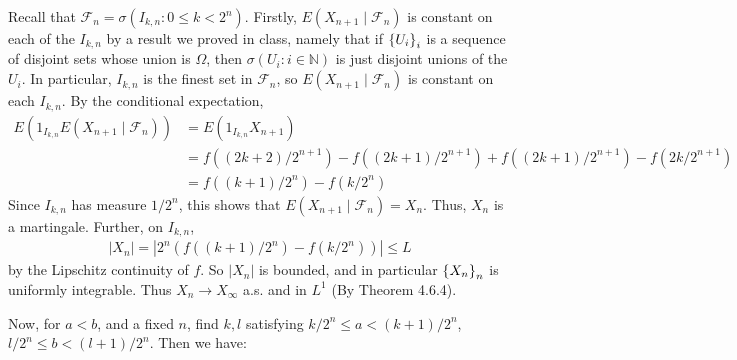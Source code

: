 \documentclass[12pt]{article}
\theoremstyle{definitionstyle}
\newcommand{\SET}[1]{\Set{\mskip-\medmuskip #1 \mskip-\medmuskip}}
\newcommand{\1}{\mathds 1}
\newcommand{\N}{\mathbb N}
\begin{document}
    Recall that $\mathcal F_n = \sigma(I_{k,n} : 0 \leq k < 2^n)$. Firstly, $E(X_{n+1} \mid \mathcal F_n)$ is constant on each of the $I_{k,n}$ by a result we proved in class, namely that if $\SET{U_i}_i$ is a sequence of disjoint sets whose union is $\Omega$, then $\sigma(U_i : i \in \N)$ is just disjoint unions of the $U_i$. In particular, $I_{k,n}$ is the finest set in $\mathcal F_n$, so $E(X_{n+1} \mid \mathcal F_n)$ is constant on each $I_{k,n}$. By the conditional expectation,
    \begin{align*}
        E(1_{I_{k,n}}E(X_{n+1} \mid \mathcal F_n)) &= E(1_{I_{k,n}}X_{n+1}) 
        \\&= f((2k+2)/2^{n+1}) - f((2k+1)/2^{n+1}) + f((2k+1)/2^{n+1}) - f(2k/2^{n+1}) 
        \\&= f((k+1)/2^n) - f(k/2^n)
    \end{align*}
    Since $I_{k,n}$ has measure $1/2^n$, this shows that $E(X_{n+1} \mid \mathcal F_n) = X_n$. Thus, $X_n$ is a martingale. Further, on $I_{k,n}$,
    \begin{align*}
        |X_n| = |2^n (f((k+1)/2^n) - f(k/2^n))| \leq L
    \end{align*}
    by the Lipschitz continuity of $f$. So $|X_n|$ is bounded, and in particular $\SET{X_n}_n$ is uniformly integrable. Thus $X_n \to X_\infty$ a.s. and in $L^1$ (By Theorem 4.6.4).

    Now, for $a < b$, and a fixed $n$, find $k,l$ satisfying $k/2^n \leq a < (k+1)/2^n$, $l/2^n \leq b < (l+1)/2^n$. Then we have:
\end{document}
